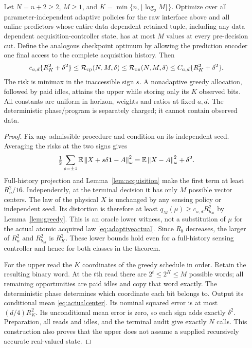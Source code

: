 \begin{theorem}\label{thm:adaptive}
Let $N=n+2\ge2$, $M\ge1$, and $K=\min\{n,\lfloor\log_2M\rfloor\}$. Optimize over all parameter-independent adaptive policies for the raw interface above and all online predictors whose entire data-dependent retained tuple, including any data-dependent acquisition-controller state, has at most $M$ values at every pre-decision cut. Define the analogous checkpoint optimum by allowing the prediction encoder one final access to the complete acquisition history. Then
\begin{equation}\label{eq:adaptivelaw}
 c_{a,d}\{R_K^2+\delta^2\}
 \le\mathcal R_{\mathrm{cp}}(N,M,\delta)
 \le\mathcal R_{\mathrm{on}}(N,M,\delta)
 \le C_{a,d}\{R_K^2+\delta^2\}.
\end{equation}
The risk is minimax in the inaccessible sign $s$. A nonadaptive greedy allocation, followed by paid idles, attains the upper while storing only its $K$ observed bits. All constants are uniform in horizon, weights and ratios at fixed $a,d$. The deterministic phase/program is separately charged; it cannot contain observed data.
\end{theorem}
\begin{proof}
Fix any admissible procedure and condition on its independent seed. Averaging the risks at the two signs gives
\[
 \tfrac12\sum_{s=\pm1}\mathbb E\left\lVert X+s\delta\mathbf1-A\right\rVert_\omega^2
 =\mathbb E\left\lVert X-A\right\rVert_\omega^2+\delta^2.
\]
Full-history projection and Lemma~\ref{lem:acquisition} make the first term at least $R_n^2/16$. Independently, at the terminal decision it has only $M$ possible vector centers. The law of the physical $X$ is unchanged by any sensing policy or independent seed. Its distortion is therefore at least $q_M(\mu)\ge c_{a,d}R_{b_M}^2$ by Lemma~\ref{lem:greedy}. This is an oracle lower witness, not a substitution of $\mu$ for the actual atomic acquired law \eqref{eq:adaptiveactual}. Since $R_b$ decreases, the larger of $R_n^2$ and $R_{b_M}^2$ is $R_K^2$. These lower bounds hold even for a full-history sensing controller and hence for both classes in the theorem.

For the upper read the $K$ coordinates of the greedy schedule in order. Retain the resulting binary word. At the $t$th read there are $2^t\le2^K\le M$ possible words; all remaining opportunities are paid idles and copy that word exactly. The deterministic phase determines which coordinate each bit belongs to. Output its conditional mean \eqref{eq:actualcenter}. Its nominal squared error is at most $(d/4)R_K^2$. Its unconditional mean error is zero, so each sign adds exactly $\delta^2$. Preparation, all reads and idles, and the terminal audit give exactly $N$ calls. This construction also proves that the upper does not assume a supplied recursively accurate real-valued state.
\end{proof}

